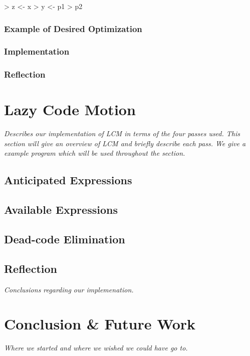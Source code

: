 \documentclass[12pt]{report}
\begin{document}
> z <- x
> y <- p1
> p2

\subsection{Example of Desired Optimization}
\subsection{Implementation}
\subsection{Reflection}

\chapter{Lazy Code Motion}
\emph{Describes our implementation of LCM in terms of the four passes
  used. This section will give an overview of LCM and briefly describe
  each pass. We give a example program which will be used throughout
  the section.}

\section{Anticipated Expressions}

\section{Available Expressions}

\section{Dead-code Elimination}

\section{Reflection}

\emph{Conclusions regarding our implemenation.}

\chapter{Conclusion \& Future Work}

\emph{Where we started and where we wished we could have go to.}
\end{document}
